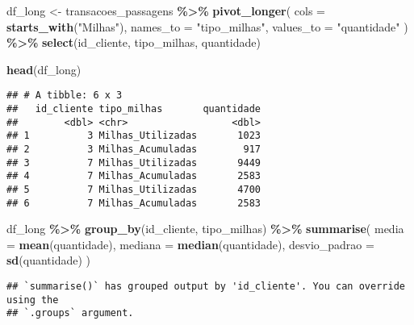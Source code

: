 \documentclass[
]{article}
\newenvironment{Shaded}{\begin{snugshade}}{\end{snugshade}}
\newcommand{\AttributeTok}[1]{\textcolor[rgb]{0.13,0.29,0.53}{#1}}
\newcommand{\FunctionTok}[1]{\textcolor[rgb]{0.13,0.29,0.53}{\textbf{#1}}}
\newcommand{\NormalTok}[1]{#1}
\newcommand{\OtherTok}[1]{\textcolor[rgb]{0.56,0.35,0.01}{#1}}
\newcommand{\SpecialCharTok}[1]{\textcolor[rgb]{0.81,0.36,0.00}{\textbf{#1}}}
\newcommand{\StringTok}[1]{\textcolor[rgb]{0.31,0.60,0.02}{#1}}
\begin{document}
\begin{Shaded}
\begin{Highlighting}[]
\NormalTok{df\_long }\OtherTok{\textless{}{-}}\NormalTok{ transacoes\_passagens }\SpecialCharTok{\%\textgreater{}\%} 
  \FunctionTok{pivot\_longer}\NormalTok{(}
    \AttributeTok{cols =} \FunctionTok{starts\_with}\NormalTok{(}\StringTok{"Milhas"}\NormalTok{),}
    \AttributeTok{names\_to =} \StringTok{"tipo\_milhas"}\NormalTok{,}
    \AttributeTok{values\_to =} \StringTok{"quantidade"}
\NormalTok{  ) }\SpecialCharTok{\%\textgreater{}\%}
  \FunctionTok{select}\NormalTok{(id\_cliente, tipo\_milhas, quantidade)}
\end{Highlighting}
\end{Shaded}

\begin{Shaded}
\begin{Highlighting}[]
\FunctionTok{head}\NormalTok{(df\_long)}
\end{Highlighting}
\end{Shaded}

\begin{verbatim}
## # A tibble: 6 x 3
##   id_cliente tipo_milhas       quantidade
##        <dbl> <chr>                  <dbl>
## 1          3 Milhas_Utilizadas       1023
## 2          3 Milhas_Acumuladas        917
## 3          7 Milhas_Utilizadas       9449
## 4          7 Milhas_Acumuladas       2583
## 5          7 Milhas_Utilizadas       4700
## 6          7 Milhas_Acumuladas       2583
\end{verbatim}

\begin{Shaded}
\begin{Highlighting}[]
\NormalTok{df\_long }\SpecialCharTok{\%\textgreater{}\%} 
  \FunctionTok{group\_by}\NormalTok{(id\_cliente, tipo\_milhas) }\SpecialCharTok{\%\textgreater{}\%}
  \FunctionTok{summarise}\NormalTok{(}
    \AttributeTok{media =} \FunctionTok{mean}\NormalTok{(quantidade),}
    \AttributeTok{mediana =} \FunctionTok{median}\NormalTok{(quantidade),}
    \AttributeTok{desvio\_padrao =} \FunctionTok{sd}\NormalTok{(quantidade)}
\NormalTok{  )}
\end{Highlighting}
\end{Shaded}

\begin{verbatim}
## `summarise()` has grouped output by 'id_cliente'. You can override using the
## `.groups` argument.
\end{verbatim}
\end{document}
